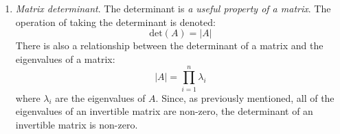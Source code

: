 \begin{enumerate}
\item \emph{Matrix determinant}.  The determinant is \emph{a useful property of a matrix}.  The operation of taking the determinant is denoted:
\begin{equation*}
\text{det}(A) = \left| A \right| 
\end{equation*}
There is also a relationship between the determinant of a matrix and the eigenvalues of a matrix:
\begin{equation*}
\left| A \right| = \prod_{i=1}^n \lambda_i
\end{equation*}
where $\lambda_i$ are the eigenvalues of $A$. Since, as previously mentioned, all of the eigenvalues of an invertible matrix are non-zero, the determinant of an invertible matrix is non-zero.  


\end{enumerate}




